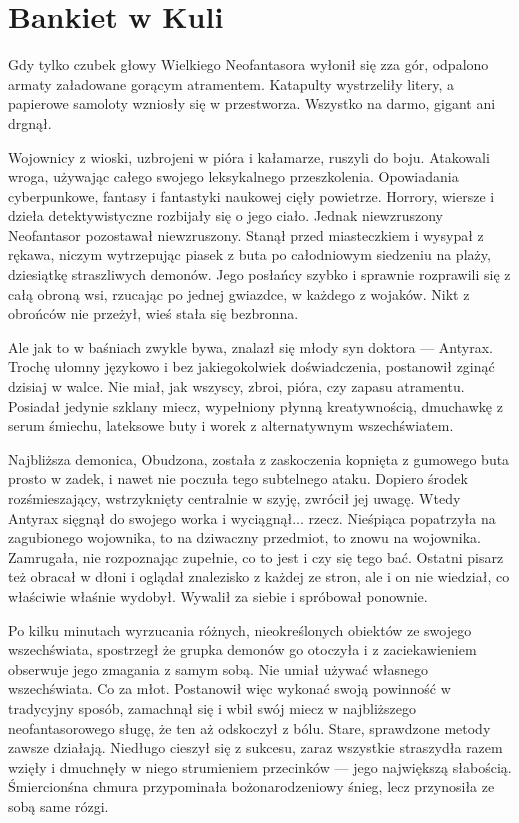 \chapter{Bankiet w Kuli}


Gdy tylko czubek głowy Wielkiego Neofantasora wyłonił się zza gór, odpalono armaty załadowane gorącym atramentem.
Katapulty wystrzeliły litery, a papierowe samoloty wzniosły się w przestworza.
Wszystko na darmo, gigant ani drgnął.

Wojownicy z wioski, uzbrojeni w pióra i kałamarze, ruszyli do boju.
Atakowali wroga, używając całego swojego leksykalnego przeszkolenia. Opowiadania cyberpunkowe, fantasy i fantastyki naukowej cięły powietrze.
Horrory, wiersze i dzieła detektywistyczne rozbijały się o jego ciało.
Jednak niewzruszony Neofantasor pozostawał niewzruszony.
Stanął przed miasteczkiem i wysypał z rękawa, niczym wytrzepując piasek z buta po całodniowym siedzeniu na plaży, dziesiątkę straszliwych demonów.
Jego posłańcy szybko i sprawnie rozprawili się z całą obroną wsi, rzucając po jednej gwiazdce, w każdego z wojaków.
Nikt z obrońców nie przeżył, wieś stała się bezbronna.

Ale jak to w baśniach zwykle bywa, znalazł się młody syn doktora --- Antyrax.
Trochę ułomny językowo i bez jakiegokolwiek doświadczenia, postanowił zginąć dzisiaj w walce.
Nie miał, jak wszyscy, zbroi, pióra, czy zapasu atramentu.
Posiadał jedynie szklany miecz, wypełniony płynną kreatywnością, dmuchawkę z serum śmiechu, lateksowe buty i worek z alternatywnym wszechświatem.

Najbliższa demonica, Obudzona, została z zaskoczenia kopnięta z gumowego buta prosto w zadek, i nawet nie poczuła tego subtelnego ataku.
Dopiero środek rozśmieszający, wstrzyknięty centralnie w szyję, zwrócił jej uwagę.
Wtedy Antyrax sięgnął do swojego worka i wyciągnął... rzecz.
Nieśpiąca popatrzyła na zagubionego wojownika, to na dziwaczny przedmiot, to znowu na wojownika. 
Zamrugała, nie rozpoznając zupełnie, co to jest i czy się tego bać.
Ostatni pisarz też obracał w dłoni i oglądał znalezisko z każdej ze stron, ale i on nie wiedział, co właściwie właśnie wydobył.
Wywalił za siebie i spróbował ponownie.

Po kilku minutach wyrzucania różnych, nieokreślonych obiektów ze swojego wszechświata, spostrzegł że grupka demonów go otoczyła i z zaciekawieniem obserwuje jego zmagania z samym sobą.
Nie umiał używać własnego wszechświata. Co za młot. 
Postanowił więc wykonać swoją powinność w tradycyjny sposób, zamachnął się i wbił swój miecz w najbliższego neofantasorowego sługę, że ten aż odskoczył z bólu. 
Stare, sprawdzone metody zawsze działają.
Niedługo cieszył się z sukcesu, zaraz wszystkie straszydła razem wzięły i dmuchnęły w niego strumieniem przecinków --- jego największą słabością.
Śmiercionśna chmura przypominała bożonarodzeniowy śnieg, lecz przynosiła ze sobą same rózgi.

